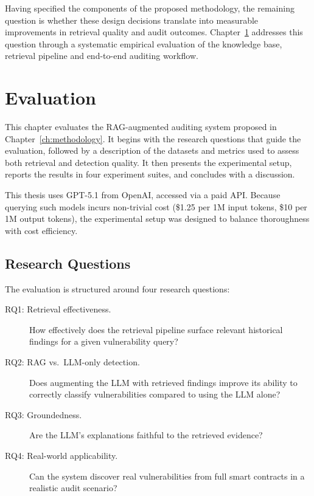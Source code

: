 Having specified the components of the proposed methodology, the remaining question is whether these design decisions translate into measurable improvements in retrieval quality and audit outcomes. Chapter~\ref{ch:evaluation} addresses this question through a systematic empirical evaluation of the knowledge base, retrieval pipeline and end-to-end auditing workflow.


\chapter{Evaluation}
\label{ch:evaluation}

This chapter evaluates the RAG-augmented auditing system proposed in Chapter~\ref{ch:methodology}. It begins with the research questions that guide the evaluation, followed by a description of the datasets and metrics used to assess both retrieval and detection quality. It then presents the experimental setup, reports the results in four experiment suites, and concludes with a discussion.

\begin{tcolorbox}[colback=gray!10, colframe=gray!40, boxrule=0.5pt]
This thesis uses GPT-5.1 from OpenAI, accessed via a paid API. Because querying such models incurs non-trivial cost (\$1.25 per 1M input tokens, \$10 per 1M output tokens), the experimental setup was designed to balance thoroughness with cost efficiency.
\end{tcolorbox}

\section{Research Questions}
\label{sec:research-questions}

The evaluation is structured around four research questions:

\begin{description}
    \item[RQ1: Retrieval effectiveness.] How effectively does the retrieval pipeline surface relevant historical findings for a given vulnerability query?

    \item[RQ2: RAG vs.\ LLM-only detection.] Does augmenting the LLM with retrieved findings improve its ability to correctly classify vulnerabilities compared to using the LLM alone?

    \item[RQ3: Groundedness.] Are the LLM's explanations faithful to the retrieved evidence?

    \item[RQ4: Real-world applicability.] Can the system discover real vulnerabilities from full smart contracts in a realistic audit scenario?
\end{description}


